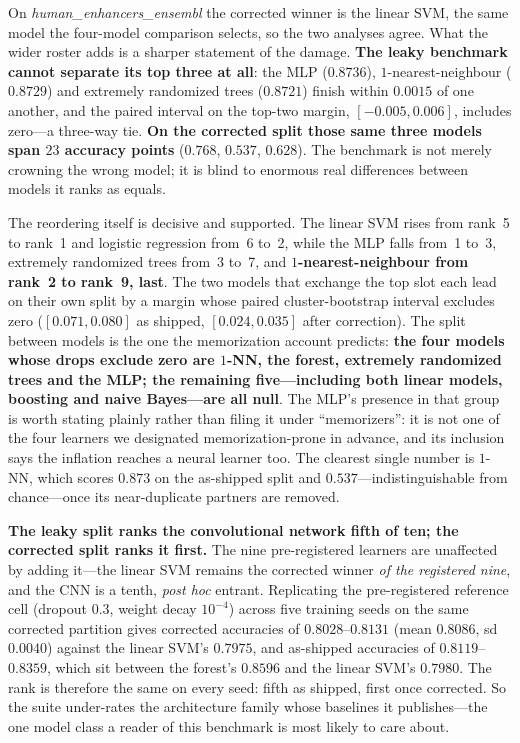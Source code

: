 \documentclass[webpdf,modern,large,namedate]{oup-authoring-template}%
\begin{document}
On \textit{human\_enhancers\_ensembl} the corrected winner is the linear SVM, the same model the four-model comparison selects, so the two analyses agree. What the wider roster adds is a sharper statement of the damage. \textbf{The leaky benchmark cannot separate its top three at all}: the MLP ($0.8736$), $1$-nearest-neighbour ($0.8729$) and extremely randomized trees ($0.8721$) finish within $0.0015$ of one another, and the paired interval on the top-two margin, $[-0.005,0.006]$, includes zero---a three-way tie. \textbf{On the corrected split those same three models span $23$ accuracy points} ($0.768$, $0.537$, $0.628$). The benchmark is not merely crowning the wrong model; it is blind to enormous real differences between models it ranks as equals.

The reordering itself is decisive and supported. The linear SVM rises from rank~5 to rank~1 and logistic regression from~6 to~2, while the MLP falls from~1 to~3, extremely randomized trees from~3 to~7, and \textbf{$1$-nearest-neighbour from rank~2 to rank~9, last}. The two models that exchange the top slot each lead on their own split by a margin whose paired cluster-bootstrap interval excludes zero ($[0.071,0.080]$ as shipped, $[0.024,0.035]$ after correction). The split between models is the one the memorization account predicts: \textbf{the four models whose drops exclude zero are $1$-NN, the forest, extremely randomized trees and the MLP; the remaining five---including both linear models, boosting and naive Bayes---are all null}. The MLP's presence in that group is worth stating plainly rather than filing it under ``memorizers'': it is not one of the four learners we designated memorization-prone in advance, and its inclusion says the inflation reaches a neural learner too. The clearest single number is $1$-NN, which scores $0.873$ on the as-shipped split and $0.537$---indistinguishable from chance---once its near-duplicate partners are removed.

\textbf{The leaky split ranks the convolutional network fifth of ten; the corrected split ranks it first.} The nine pre-registered learners are unaffected by adding it---the linear SVM remains the corrected winner \emph{of the registered nine}, and the CNN is a tenth, \emph{post hoc} entrant. Replicating the pre-registered reference cell (dropout $0.3$, weight decay $10^{-4}$) across five training seeds on the same corrected partition gives corrected accuracies of $0.8028$--$0.8131$ (mean $0.8086$, sd $0.0040$) against the linear SVM's $0.7975$, and as-shipped accuracies of $0.8119$--$0.8359$, which sit between the forest's $0.8596$ and the linear SVM's $0.7980$. The rank is therefore the same on every seed: fifth as shipped, first once corrected. So the suite under-rates the architecture family whose baselines it publishes---the one model class a reader of this benchmark is most likely to care about.
\end{document}
